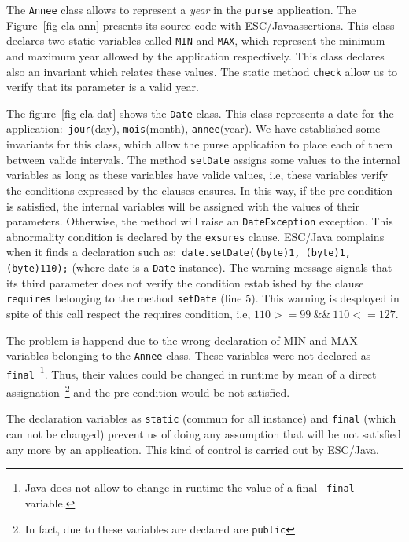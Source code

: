 \documentclass[a4paper]{llncs}
\begin{document}
The \texttt{Annee} class allows to represent a \textit{year} in the
\texttt{purse} application. The Figure~\ref{fig-cla-ann} presents its
source code with ESC/Javaassertions. This class declares two 
static variables called \texttt{MIN} and \texttt{MAX}, which represent
the minimum and maximum year allowed by the application
respectively. This class declares
also an invariant which relates these values. The static method
\texttt{check} allow us to verify that its parameter is a valid
year. 

The figure~\ref{fig-cla-dat} shows the \texttt{Date} class. This class
represents a date for the application$:$ \texttt{jour}(day),
\texttt{mois}(month), \texttt{annee}(year). We have established some
invariants for this class, which allow the purse application to place
each of them between valide intervals. The method \texttt{setDate}
assigns some values to the internal variables as long as
these variables have valide values, i.e, these variables verify the
conditions expressed by the clauses ensures. In this way, if the
pre-condition is satisfied, the internal variables will be assigned
with the values of their parameters. Otherwise, the method will raise
an \texttt{DateException} exception. This abnormality condition is
declared by the \texttt{exsures} clause. ESC/Java complains when it
finds a declaration such as$:$ 
\mbox{\tt date.setDate((byte)1, (byte)1, (byte)110);} (where date is a
\texttt{Date} instance). The warning message signals that its third
parameter does not verify the condition established by the clause
\texttt{requires} belonging to the method \texttt{setDate} (line
$5$). This warning is desployed in spite of this call respect the
requires condition, i.e, $110>=99\ \&\&\ 110<= 127$.

The problem is happend due to the wrong declaration of \textsc{MIN}
and \textsc{MAX} variables belonging to the \texttt{Annee}
class. These variables were not declared as \texttt{final}~\footnote{{\sc
Java} does not allow to change in runtime the value of a final {\tt
final} variable.}. Thus, their values could be changed in runtime by
mean of a direct assignation~\footnote{In fact, due to these variables
are declared are \texttt{public}} and the pre-condition would be not
satisfied. 


The declaration variables as \texttt{static} (commun for all instance)
and \texttt{final} (which can not be changed) prevent us of doing
any assumption that will be not satisfied any more by an
application. This kind of control is carried out by
ESC/Java. 
\end{document}
